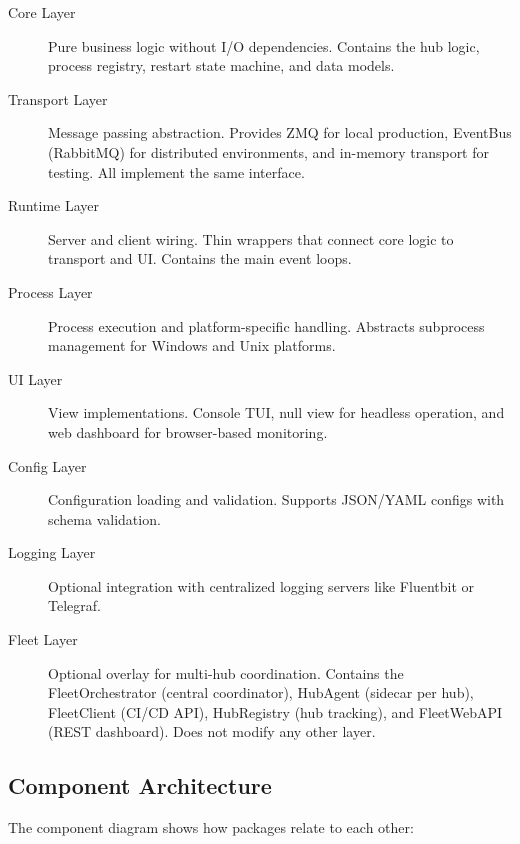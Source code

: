 \begin{description}
   \item[Core Layer] Pure business logic without I/O dependencies. Contains the hub logic,
        process registry, restart state machine, and data models.

   \item[Transport Layer] Message passing abstraction. Provides ZMQ for local production,
        EventBus (RabbitMQ) for distributed environments, and in-memory transport for testing.
        All implement the same interface.

   \item[Runtime Layer] Server and client wiring. Thin wrappers that connect core logic
        to transport and UI. Contains the main event loops.

   \item[Process Layer] Process execution and platform-specific handling. Abstracts
        subprocess management for Windows and Unix platforms.

   \item[UI Layer] View implementations. Console TUI, null view for headless operation,
        and web dashboard for browser-based monitoring.

   \item[Config Layer] Configuration loading and validation. Supports JSON/YAML configs
        with schema validation.

   \item[Logging Layer] Optional integration with centralized logging servers like
        Fluentbit or Telegraf.

   \item[Fleet Layer] Optional overlay for multi-hub coordination. Contains the
        FleetOrchestrator (central coordinator), HubAgent (sidecar per hub),
        FleetClient (CI/CD API), HubRegistry (hub tracking), and FleetWebAPI
        (REST dashboard). Does not modify any other layer.
\end{description}

\subsection{Component Architecture}

The component diagram shows how packages relate to each other:

